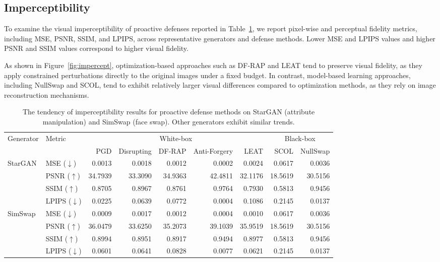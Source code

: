 \documentclass{article}
\begin{document}
\clearpage

\subsection{Imperceptibility}
\label{appendix:impercep}
To examine the visual imperceptibility of proactive defenses reported in Table~\ref{tab:appendix_impercep}, we report pixel-wise and perceptual fidelity metrics, including MSE, PSNR, SSIM, and LPIPS, across representative generators and defense methods. Lower MSE and LPIPS values and higher PSNR and SSIM values correspond to higher visual fidelity. 

As shown in Figure~\ref{fig:impercept}, optimization-based approaches such as DF-RAP and LEAT tend to preserve visual fidelity, as they apply constrained perturbations directly to the original images under a fixed budget. In contrast, model-based learning approaches, including NullSwap and SCOL, tend to exhibit relatively larger visual differences compared to optimization methods, as they rely on image reconstruction mechanisms. 

\begin{table}[h!]
\centering
\scriptsize
\caption{The tendency of imperceptibility results for proactive defense methods on StarGAN (attribute manipulation) and SimSwap (face swap). Other generators exhibit similar trends.}
\label{tab:appendix_impercep}

\begin{tabular}{l l rrrrr rr}
\toprule
\multirow{2}{*}{Generator} & \multirow{2}{*}{Metric}
& \multicolumn{5}{c}{White-box} & \multicolumn{2}{c}{Black-box} \\
\cmidrule(lr){3-7}\cmidrule(lr){8-9}
& & PGD & Disrupting & DF-RAP & Anti-Forgery & LEAT & SCOL & NullSwap \\
\midrule

\multirow{4}{*}{StarGAN}
& MSE ($\downarrow$)     & 0.0013 & 0.0018 & 0.0012 & 0.0002 & 0.0024 & 0.0617 & 0.0036 \\
& PSNR ($\uparrow$)    & 34.7939 & 33.3090 & 34.9363 & 42.4811 & 32.1176 & 18.5619 & 30.5156 \\
& SSIM ($\uparrow$)    & 0.8705 & 0.8967 & 0.8761 & 0.9764 & 0.7930 & 0.5813 & 0.9456 \\
& LPIPS ($\downarrow$) & 0.0225 & 0.0639 & 0.0772 & 0.0004 & 0.1086 & 0.2145 & 0.0137 \\
\midrule

\multirow{4}{*}{SimSwap}
& MSE ($\downarrow$)     & 0.0009 & 0.0017 & 0.0012 & 0.0004 & 0.0010 & 0.0617 & 0.0036 \\
& PSNR ($\uparrow$)    & 36.0479 & 33.6250 & 35.2073 & 39.1039 & 35.9519 & 18.5619 & 30.5156 \\
& SSIM ($\uparrow$)    & 0.8994 & 0.8951 & 0.8917 & 0.9494 & 0.8977 & 0.5813 & 0.9456 \\
& LPIPS ($\downarrow$) & 0.0601 & 0.0641 & 0.0828 & 0.0077 & 0.0621 & 0.2145 & 0.0137 \\
\bottomrule
\end{tabular}
\end{table}
\end{document}
